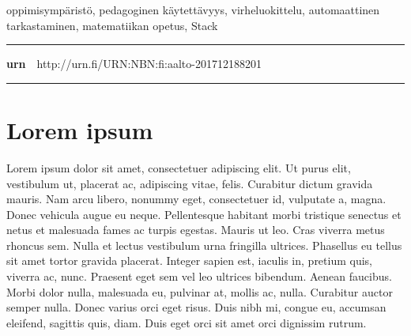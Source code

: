  \begin{spacing}{.88}
  {\parindent0pt %

  \parbox[t]{121.6mm}{\raggedright\small oppimisympäristö, pedagoginen käytettävyys, virheluokittelu, automaattinen tarkastaminen, matematiikan opetus, Stack}

  \vspace{.5mm}\rule{\textwidth}{.75pt}

  {\fontsize{10.5pt}{10.5pt}\bfseries\sffamily\lsstyle urn}~~{\small http://urn.fi/URN:NBN:fi:aalto-201712188201}

  \vspace{-2.4mm}\rule{\textwidth}{.75pt}

  } %
  \end{spacing}

  \restoregeometry  %




  \newpage

  \tableofcontents


  \newpage


  \chapter{Lorem ipsum}

  Lorem ipsum dolor sit amet, consectetuer adipiscing elit. Ut purus
  elit, vestibulum ut, placerat ac, adipiscing vitae, felis. Curabitur
  dictum gravida mauris. Nam arcu libero, nonummy eget, consectetuer id,
  vulputate a, magna. Donec vehicula augue eu neque. Pellentesque
  habitant morbi tristique senectus et netus et malesuada fames ac
  turpis egestas. Mauris ut leo. Cras viverra metus rhoncus sem. Nulla
  et lectus vestibulum urna fringilla ultrices. Phasellus eu tellus sit
  amet tortor gravida placerat. Integer sapien est, iaculis in, pretium
  quis, viverra ac, nunc. Praesent eget sem vel leo ultrices
  bibendum. Aenean faucibus. Morbi dolor nulla, malesuada eu, pulvinar
  at, mollis ac, nulla. Curabitur auctor semper nulla.  Donec varius
  orci eget risus. Duis nibh mi, congue eu, accumsan eleifend, sagittis
  quis, diam. Duis eget orci sit amet orci dignissim rutrum.

